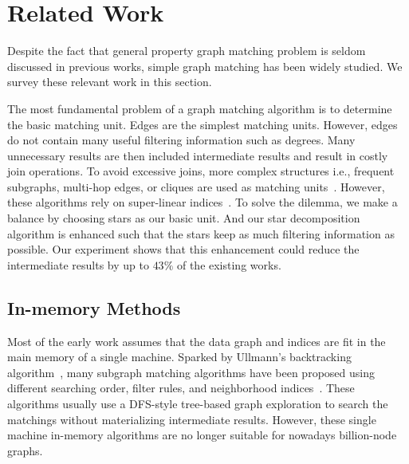 \section{Related Work}
Despite the fact that general property graph matching problem is seldom discussed in previous works,
simple graph matching has been widely studied.
We survey these relevant work in this section.

The most fundamental problem of a graph matching algorithm is to determine the basic matching unit.
Edges are the simplest matching units.
However, edges do not contain many useful filtering information such as degrees.
Many unnecessary results are then included intermediate results and result in costly join operations.
To avoid excessive joins, more complex structures i.e.,
frequent subgraphs, multi-hop edges, or cliques are used as matching units~\cite{DBLP:conf/sigmod/HeS08,DBLP:conf/edbt/ZhangLY09,DBLP:journals/pvldb/QiaoZC17}.
However, these algorithms rely on super-linear indices~\cite{DBLP:journals/pvldb/SunWWSL12}.
To solve the dilemma, we make a balance by choosing stars as our basic unit.
And our star decomposition algorithm is enhanced such that the stars keep as much filtering information as possible.
Our experiment shows that this enhancement could reduce the intermediate results by up to $43\%$ of the existing works.

\subsection*{In-memory Methods}
Most of the early work assumes that the data graph and indices are fit in the main memory of a single machine.
Sparked by Ullmann's backtracking algorithm~\cite{DBLP:journals/jacm/Ullmann76},
many subgraph matching algorithms have been proposed using different searching order, filter rules, and neighborhood indices~\cite{DBLP:journals/pami/CordellaFSV04,DBLP:journals/pvldb/ShangZLY08,DBLP:conf/sigmod/HeS08,DBLP:conf/sigmod/HanLL13,DBLP:journals/pvldb/LeeHKL12}.
These algorithms usually use a DFS-style tree-based graph exploration to search the matchings without materializing intermediate results.
However, these single machine in-memory algorithms are no longer suitable for nowadays billion-node graphs.

